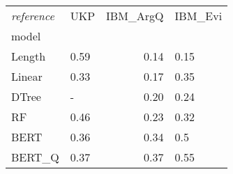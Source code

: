 \begin{tabular}{llrl}
\toprule
\textit{reference} &   UKP &  IBM\_ArgQ & IBM\_Evi \\
model  &       &           &         \\
\midrule
Length &  0.59 &      0.14 &    0.15 \\
Linear &  0.33 &      0.17 &    0.35 \\
DTree  &     - &      0.20 &    0.24 \\
RF     &  0.46 &      0.23 &    0.32 \\
BERT   &  0.36 &      0.34 &     0.5 \\
BERT\_Q &  0.37 &      0.37 &    0.55 \\
\bottomrule
\end{tabular}
